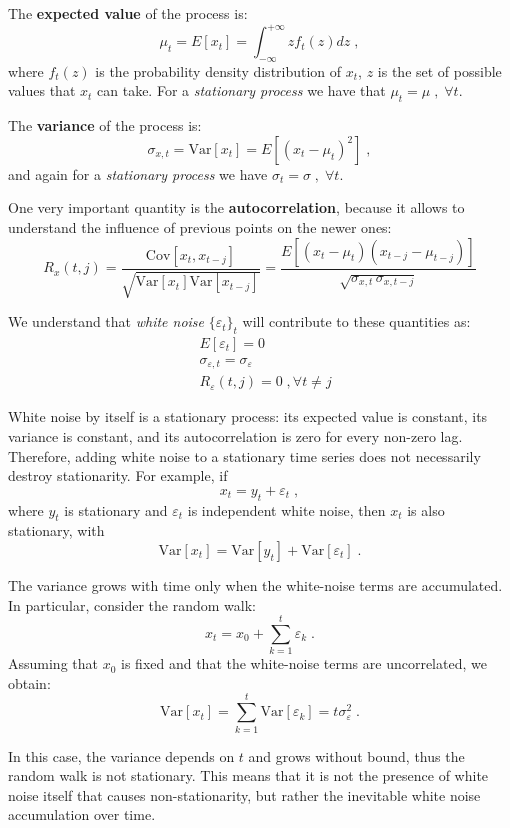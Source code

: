 \documentclass[12pt,a4paper]{article}
\begin{document}
The \textbf{expected value} of the process is:
$$
\mu_t = E[x_t] = \int_{-\infty}^{+\infty} z f_t(z)dz \;,
$$
where $f_t(z)$ is the probability density distribution of $x_t$, $z$ is the set of possible values that $x_t$ can take. For a \textit{stationary process} we have that $\mu_t = \mu \;,\; \forall t$.

The \textbf{variance} of the process is:
$$
\sigma_{x,t} = \text{Var}[x_t] = E[(x_t - \mu_t)^2] \;,
$$
and again for a \textit{stationary process} we have $\sigma_t = \sigma \;,\; \forall t$.

One very important quantity is the \textbf{autocorrelation}, because it allows to understand the influence of previous points on the newer ones:
$$
R_x(t,j) = \dfrac{\text{Cov}[x_t,x_{t-j}]}{\sqrt{\text{Var}[x_t] \text{Var}[x_{t-j}]}} = \dfrac{E[(x_t-\mu_t)(x_{t-j}-\mu_{t-j})]}{\sqrt{\sigma_{x,t} \, \sigma_{x,t-j}}}
$$

We understand that \textit{white noise} $\{\varepsilon_t\}_t$ will contribute to these quantities as:
\begin{align*}
	&E[\varepsilon_t] = 0\\
	&\sigma_{\varepsilon,t} = \sigma_{\varepsilon}\\
	&R_{\varepsilon}(t,j) = 0\;, \forall t\neq j
\end{align*}

White noise by itself is a stationary process: its expected value is constant, its variance is constant, and its autocorrelation is zero for every non-zero lag. Therefore, adding white noise to a stationary time series does not necessarily destroy stationarity. For example, if
$$
x_t = y_t + \varepsilon_t\;,
$$
where $y_t$ is stationary and $\varepsilon_t$ is independent white noise, then $x_t$ is also stationary, with
$$
\text{Var}[x_t] = \text{Var}[y_t] + \text{Var}[\varepsilon_t]\;.
$$

The variance grows with time only when the white-noise terms are accumulated. In particular, consider the random walk:
$$
x_t = x_0 + \sum_{k=1}^{t}\varepsilon_k\;.
$$
Assuming that $x_0$ is fixed and that the white-noise terms are uncorrelated, we obtain:
$$
\text{Var}[x_t] = \sum_{k=1}^{t}\text{Var}[\varepsilon_k]
= t\sigma_{\varepsilon}^{2}\;.
$$

In this case, the variance depends on $t$ and grows without bound, thus the random walk is not stationary. This means that it is not the presence of white noise itself that causes non-stationarity, but rather the inevitable white noise accumulation over time.
\end{document}
